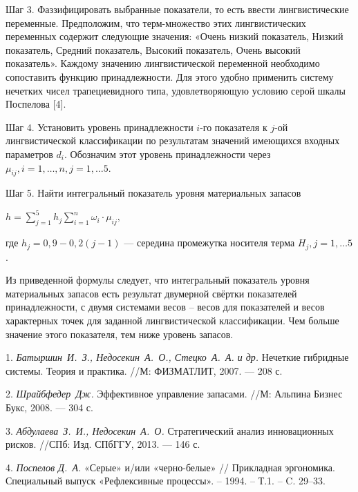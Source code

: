 \documentclass{vzmsthesis}
\begin{document}
Шаг 3.
Фаззифицировать выбранные показатели, то есть ввести лингвистические переменные. 
Предположим, что терм-множество этих лингвистических переменных содержит следующие значения: «Очень низкий показатель, Низкий показатель, Средний показатель, Высокий показатель, Очень высокий показатель». Каждому значению лингвистической переменной необходимо сопоставить функцию принадлежности. Для этого удобно применить систему нечетких чисел трапециевидного типа, удовлетворяющую условию серой шкалы Поспелова [4]. 

Шаг 4.
Установить уровень принадлежности $i$-го показателя к $j$-ой лингвистической классификации по результатам значений имеющихся входных параметров $d_{i}$. Обозначим этот уровень принадлежности через $\mu_{ij}, i = 1, \ldots, n,  j = 1, \ldots 5$.

Шаг 5.
Найти интегральный показатель уровня материальных запасов
\begin{center}
$ h = \sum_{j = 1}^{5} h_{j} \sum_{i = 1}^{n} \omega_{i} \cdot \mu_{ij},$
\end{center}
где $h_{j} = 0,9 - 0,2(j - 1)$ --- середина промежутка носителя терма $H_{j}, j = 1, \ldots 5$.

Из приведенной формулы следует, что  интегральный показатель уровня материальных запасов есть результат двумерной свёртки показателей принадлежности, с двумя системами весов – весов для показателей и весов характерных точек для заданной  лингвистической классификации. Чем больше значение этого показателя, тем ниже уровень запасов.



\litlist

1. {\it Батыршин~И.~З., Недосекин~А.~О., Стецко~А.~А. и др.} Нечеткие гибридные системы. Теория и
практика. //М: ФИЗМАТЛИТ, 2007. — 208 с.

2. {\it Шрайбфедер~Дж.} Эффективное управление запасами. //М: Альпина Бизнес Букс, 2008. — 304 с.

3. {\it Абдулаева~З.~И., Недосекин~А.~О.} Стратегический анализ инновационных рисков. //СПб: Изд. СПбГГУ, 2013. — 146 с.

4. {\it Поспелов Д.~А.} «Серые» и/или «черно-белые» // Прикладная эргономика. Специальный выпуск  «Рефлексивные процессы». – 1994. – Т.1. – C. 29–33. 
\end{document}

